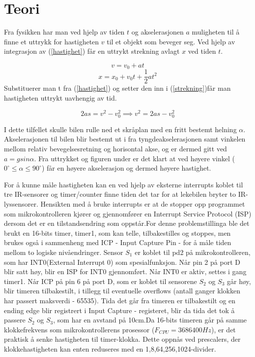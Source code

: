 \documentclass[11pt, a4paper]{article}
\begin{document}
\section{Teori}
Fra fysikken har man ved hjelp av tiden $t$ og akselerasjonen $a$ muligheten til å finne et uttrykk for hastigheten $v$ til et objekt som beveger seg. Ved hjelp av integrasjon av (\ref{hastighet}) får en uttrykt strekning avlagt $x$ ved tiden $t$.

\begin{equation} \label{hastighet}
v = v_{0} + at
\end{equation}
\begin{equation} \label{strekning}
x = x_{0} + v_{0}t + \frac{1}{2}at^{2}
\end{equation}
Substituerer man t fra (\ref{hastighet}) og setter den inn i (\ref{strekning})får man hastigheten uttrykt uavhengig av tid.

\begin{equation}
2as = v^{2}-v_{0}^{2} \implies v^{2} = 2as-v_{0}^{2}
\end{equation}
\newline

I dette tilfellet skulle bilen rulle ned et skråplan med en fritt bestemt helning $\alpha$. Akselerasjonen til bilen blir bestemt ut i fra tyngdeakselerasjonen samt vinkelen mellom relativ bevegelsesretning og horisontal akse, og er dermed gitt ved $a = gsin \alpha$. Fra uttrykket og figuren under er det klart at ved høyere vinkel ($0^\circ \leq\alpha\leq 90^\circ$) får en høyere akselerasjon og dermed høyere hastighet.\newline

For å kunne måle hastigheten kan en ved hjelp av eksterne interrupts koblet til tre IR-sensorer og timer/counter finne tiden det tar for at lekebilen bryter to IR-lyssensorer.
Hensikten med å bruke interrupts er at de stopper opp programmet som mikrokontrolleren kjører og gjennomfører en Interrupt Service Protocol (ISP) dersom det er en tilstandsendring som oppstår.\newline For denne problemstillinga ble det brukt en 16-bits timer, timer1, som kan telle, tilbakestilles og stoppes, men brukes også i sammenheng med ICP - Input Capture Pin - for å måle tiden mellom to logiske nivåendringer. 
Sensor $S_{1}$ er koblet til pd2 på mikrokontrolleren, som har INT0(External Interrupt 0) som spesialfunksjon. Når pin 2 på port D blir satt høy, blir en ISP for INT0 gjennomført. Når INT0 er aktiv, settes i gang timer1. Når ICP på pin 6 på port D, som er koblet til sensorene $S_{2}$ og $S_{3}$ går høy, blir timeren tilbakestilt, i tillegg til eventuelle overflows (antall ganger klokken har passert maksverdi - 65535). Tida det går fra timeren er tilbakestilt og en ending edge blir registrert i Input Capture - registeret, blir da tida det tok å passere $S_{2}$ og $S_{3}$, som har en avstand på 10cm.\newline Da 16-bits timeren går på samme klokkefrekvens som mikrokontrollerens prosessor ($F_{CPU} = 3686400 Hz$), er det praktisk å senke hastigheten til timer-klokka. Dette oppnås ved prescalers, der klokkehastigheten kan enten reduseres med en 1,8,64,256,1024-divider. 
\end{document}

